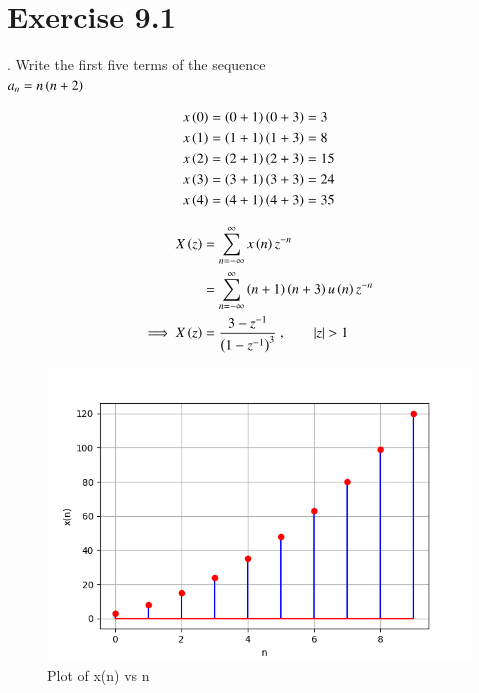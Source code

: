 \documentclass[journal,12pt,twocolumn]{IEEEtran}
\begin{document}


\vspace{3cm}

\title{}
\author{EE23BTECH11024 - G.Karthik Yadav$^{*}$
}
\maketitle
\newpage
\bigskip


\section*{Exercise 9.1}

. \hspace{2pt}Write the first five terms of the sequence\\
$a_n = n \left(n+2\right)$

\solution



\begin{align}
	x \left(0\right) & = \left(0+1\right)\left(0+3\right) = 3 \\
x \left(1\right) & = \left(1+1\right)\left(1+3\right) = 8\\
x \left(2\right) & = \left(2+1\right)\left(2+3\right) = 15\\
x \left(3\right) & = \left(3+1\right)\left(3+3\right) = 24\\
x \left(4\right) & = \left(4+1\right)\left(4+3\right) = 35
\end{align} 

\begin{align}
    X \left(z\right) & = \sum_{n=-\infty}^{\infty} x \left(n\right)   z^{-n} \\
    & = \sum_{n=-\infty}^{\infty}  \left(n+1\right)\left(n+3\right) u \left(n\right)   z^{-n} \\
    \implies X \left(z\right) & = \frac{ 3-z^{-1}}{\left(1-z^{-1}\right)^3} \text{ ,}\qquad \left\vert z\right\vert>1
\end{align}

\begin{figure}[ht]
   \centering
   \includegraphics[width=1\columnwidth]{figs/plot1.png}
   \caption{Plot of x(n) vs n}
   \label{fig: 1.11.9.1.1}
\end{figure}
\end{document}
